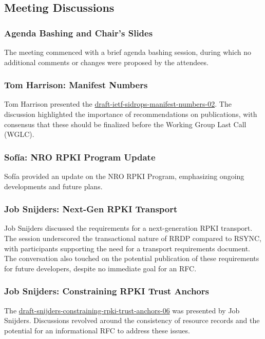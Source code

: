 \documentclass{article}
\begin{document}
\subsection{Meeting Discussions}

\subsubsection{Agenda Bashing and Chair's Slides}
The meeting commenced with a brief agenda bashing session, during which no additional comments or changes were proposed by the attendees.

\subsubsection{Tom Harrison: Manifest Numbers}
Tom Harrison presented the \href{https://datatracker.ietf.org/doc/html/draft-ietf-sidrops-manifest-numbers-02}{draft-ietf-sidrops-manifest-numbers-02}. The discussion highlighted the importance of recommendations on publications, with consensus that these should be finalized before the Working Group Last Call (WGLC).

\subsubsection{Sofía: NRO RPKI Program Update}
Sofía provided an update on the NRO RPKI Program, emphasizing ongoing developments and future plans.

\subsubsection{Job Snijders: Next-Gen RPKI Transport}
Job Snijders discussed the requirements for a next-generation RPKI transport. The session underscored the transactional nature of RRDP compared to RSYNC, with participants supporting the need for a transport requirements document. The conversation also touched on the potential publication of these requirements for future developers, despite no immediate goal for an RFC.

\subsubsection{Job Snijders: Constraining RPKI Trust Anchors}
The \href{https://datatracker.ietf.org/doc/html/draft-snijders-constraining-rpki-trust-anchors-06}{draft-snijders-constraining-rpki-trust-anchors-06} was presented by Job Snijders. Discussions revolved around the consistency of resource records and the potential for an informational RFC to address these issues.
\end{document}
